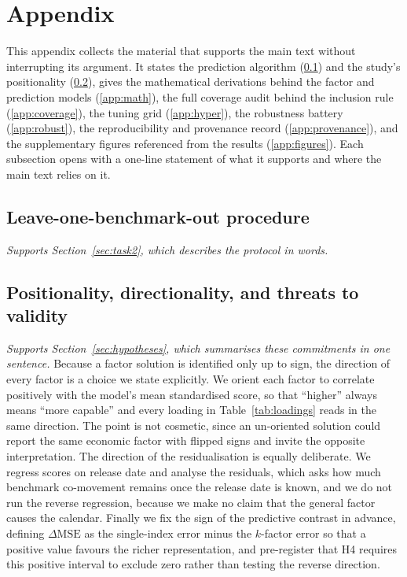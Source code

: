 \appendix
\section*{Appendix}
\renewcommand{\thesubsection}{\Alph{subsection}}
\setcounter{subsection}{0}

This appendix collects the material that supports the main text without interrupting its argument. It
states the prediction algorithm (\ref{app:algorithm}) and the study's positionality (\ref{app:positionality}),
gives the mathematical derivations behind the factor and prediction models (\ref{app:math}), the full
coverage audit behind the inclusion rule (\ref{app:coverage}), the tuning grid (\ref{app:hyper}), the
robustness battery (\ref{app:robust}), the reproducibility and provenance record (\ref{app:provenance}),
and the supplementary figures referenced from the results (\ref{app:figures}). Each subsection opens with
a one-line statement of what it supports and where the main text relies on it.

\subsection{Leave-one-benchmark-out procedure}\label{app:algorithm}
\emph{Supports Section~\ref{sec:task2}, which describes the protocol in words.}


\subsection{Positionality, directionality, and threats to validity}\label{app:positionality}
\emph{Supports Section~\ref{sec:hypotheses}, which summarises these commitments in one sentence.}
Because a factor solution is identified only up to sign, the direction of every factor is a choice we
state explicitly. We orient each factor to correlate positively with the model's mean standardised
score, so that ``higher'' always means ``more capable'' and every loading in Table~\ref{tab:loadings}
reads in the same direction. The point is not cosmetic, since an un-oriented solution could report the
same economic factor with flipped signs and invite the opposite interpretation. The direction of the
residualisation is equally deliberate. We regress scores on release date and analyse the residuals,
which asks how much benchmark co-movement remains once the release date is known, and we do not run the
reverse regression, because we make no claim that the general factor causes the calendar. Finally we fix
the sign of the predictive contrast in advance, defining $\Delta\mathrm{MSE}$ as the single-index error
minus the $k$-factor error so that a positive value favours the richer representation, and pre-register
that H4 requires this positive interval to exclude zero rather than testing the reverse direction.

